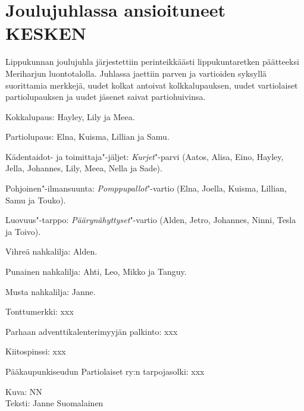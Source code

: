 \section{Joulujuhlassa ansioituneet KESKEN}

\begin{multicols}{2}
\noindent Lippukunnan joulujuhla järjestettiin perinteikkäästi lippukuntaretken päätteeksi Meriharjun luontotalolla. Juhlassa jaettiin parven ja vartioiden syksyllä suorittamia merkkejä, uudet kolkat antoivat kolkkalupauksen, uudet vartiolaiset partiolupauksen ja uudet jäsenet saivat partiohuivinsa.

Kokkalupaus: Hayley, Lily ja Meea.

Partiolupaus: Elna, Kuisma, Lillian ja Samu.

Kädentaidot- ja toimittaja"-jäljet: \textit{Kurjet}"-parvi (Aatos, Alisa, Eino, Hayley, Jella, Johannes, Lily, Meea, Nella ja Sade).

Pohjoinen"-ilmansuunta: \textit{Pomppupallot}"-vartio (Elna, Joella, Kuisma, Lillian, Samu ja Touko).

Luovuus"-tarppo: \textit{Päärynähyttyset}"-vartio (Alden, Jetro, Johannes, Ninni, Tesla ja Toivo).

Vihreä nahkalilja: Alden.

Punainen nahkalilja: Ahti, Leo, Mikko ja Tanguy.

Musta nahkalilja: Janne.

Tonttumerkki: xxx

Parhaan adventtikalenterimyyjän palkinto: xxx

Kiitospinssi: xxx

Pääkaupunkiseudun Partiolaiset ry:n tarpojasolki: xxx
\end{multicols}

\vspace*{.50cm}
{\raggedleft Kuva: NN\\
Teksti: Janne Suomalainen\par}
